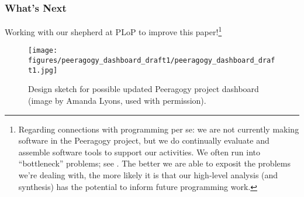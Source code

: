 \subsubsection*{What's Next} 
Working with our shepherd at PLoP to improve this paper!\footnote{Regarding connections with programming per se: we are not currently making software in the Peeragogy project, but we do continually evaluate and assemble software tools to support our activities. We often run into ``bottleneck'' problems; see .  The better we are able to exposit the problems we're dealing with, the more likely it is that our high-level analysis (and synthesis) has the potential to inform future programming work.}


\begin{figure}
\texttt{[image: figures/peeragogy\_dashboard\_draft1/peeragogy\_dashboard\_draft1.jpg]}
\caption{Design sketch for possible updated Peeragogy project dashboard (image by Amanda Lyons, used with permission).}
\end{figure}
